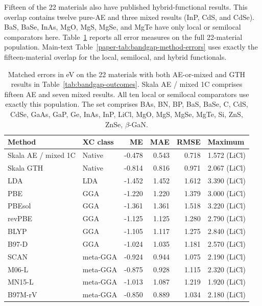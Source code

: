 \documentclass[10pt,a4paper]{article}
\begin{document}
Fifteen of the 22 materials also have published hybrid-functional results. This overlap contains twelve pure-AE and three mixed results (InP, CdS, and CdSe). BaS, BaSe, InAs, MgO, MgS, MgSe, and MgTe have only local or semilocal comparators here. Table~\ref{tab:bandgap-paired-combined-Lee2021} reports all error measures on the full 22-material population. Main-text Table~\ref{paper-tab:bandgap-method-errors} uses exactly the fifteen-material overlap for the local, semilocal, and hybrid functionals.

\begingroup\small\setlength{\tabcolsep}{4pt}
\begin{table}[htbp]
\centering
\caption{Matched errors in eV on the 22 materials with both AE-or-mixed and GTH results in Table~\ref{tab:bandgap-outcomes}. Skala AE / mixed 1C comprises fifteen AE and seven mixed results. All ten local or semilocal comparators use exactly this population.\cite{Lee2021Gaps} The set comprises BAs, BN, BP, BaS, BaSe, C, CdS, CdSe, GaAs, GaP, Ge, InAs, InP, LiCl, MgO, MgS, MgSe, MgTe, Si, ZnS, ZnSe, $\beta$-GaN.}\label{tab:bandgap-paired-combined-Lee2021}
\begin{tabular}{llrrrl}
\toprule
Method & XC class & ME & MAE & RMSE & Maximum \\
\midrule
Skala AE / mixed 1C & Native & -0.478 & 0.543 & 0.718 & 1.572 (LiCl) \\
Skala GTH & Native & -0.814 & 0.816 & 0.971 & 2.067 (LiCl) \\
LDA & LDA & -1.452 & 1.452 & 1.612 & 3.390 (LiCl) \\
PBE & GGA & -1.220 & 1.220 & 1.379 & 3.000 (LiCl) \\
PBEsol & GGA & -1.361 & 1.361 & 1.518 & 3.220 (LiCl) \\
revPBE & GGA & -1.125 & 1.125 & 1.280 & 2.790 (LiCl) \\
BLYP & GGA & -1.105 & 1.117 & 1.275 & 2.840 (LiCl) \\
B97-D & GGA & -1.024 & 1.035 & 1.181 & 2.570 (LiCl) \\
SCAN & meta-GGA & -0.924 & 0.944 & 1.075 & 2.190 (LiCl) \\
M06-L & meta-GGA & -0.875 & 0.928 & 1.115 & 2.320 (LiCl) \\
MN15-L & meta-GGA & -1.013 & 1.087 & 1.219 & 1.920 (LiCl) \\
B97M-rV & meta-GGA & -0.850 & 0.889 & 1.034 & 2.180 (LiCl) \\
\bottomrule
\end{tabular}
\end{table}
\FloatBarrier
\endgroup
\end{document}
